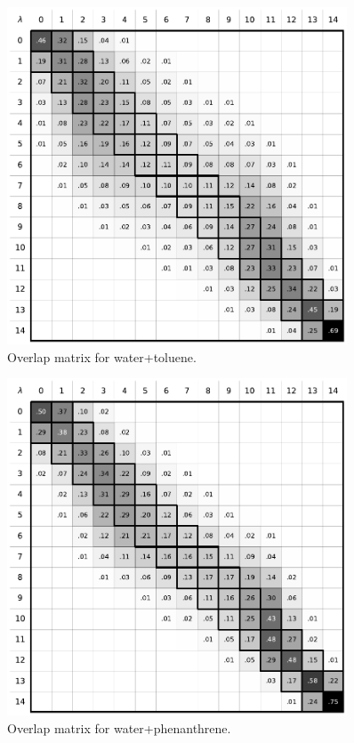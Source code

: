 \documentclass[
	12pt,				%
	openany,			%
	oneside,			%
	a4paper,			%
	english,			%
	brazil				%
	]{abntex2}
\begin{document}
\begin{apendicesenv}
\begin{figure}[H]
	\centering
	\includegraphics[width=0.9\textwidth]{Figures/owat_tol}
	\caption{Overlap matrix for water+toluene.}
\end{figure}

\begin{figure}[H]
	\centering
	\includegraphics[width=0.9\textwidth]{Figures/owat_phen}
	\caption{Overlap matrix for water+phenanthrene.}
\end{figure}


\end{apendicesenv}
\end{document}
